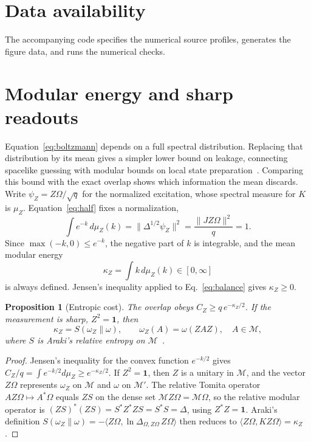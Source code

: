 \documentclass[11pt,a4paper]{article}
\providecommand{\openone}{\mathbf{1}}
\newtheorem{proposition}[theorem]{Proposition}
\newcommand{\M}{\mathcal M}
\newcommand{\id}{\openone}
\begin{document}
\section*{Data availability}
The accompanying code specifies the numerical source profiles, generates the figure data, and runs the numerical checks.

\appendix

\section{Modular energy and sharp readouts}
\label{sec:cost}

Equation~\eqref{eq:boltzmann} depends on a full spectral distribution. Replacing that distribution by its mean gives a simpler lower bound on leakage, connecting spacelike guessing with modular bounds on local state preparation~\cite{blanco2026modular}. Comparing this bound with the exact overlap shows which information the mean discards. Write $\psi_Z=Z\Omega/\sqrt q$ for the normalized excitation, whose spectral measure for $K$ is $\mu_Z$. Equation~\eqref{eq:half} fixes a normalization,
\begin{equation}
 \int e^{-k}\,d\mu_Z(k)=\|\Delta^{1/2}\psi_Z\|^2=\frac{\|JZ\Omega\|^2}{q}=1 .
 \label{eq:balance}
\end{equation}
Since $\max(-k,0)\le e^{-k}$, the negative part of $k$ is integrable, and the mean modular energy
\begin{equation}
 \kappa_Z=\int k\,d\mu_Z(k)\in[0,\infty]
 \label{eq:kappa}
\end{equation}
is always defined. Jensen's inequality applied to Eq.~\eqref{eq:balance} gives $\kappa_Z\ge0$.

\begin{proposition}[Entropic cost]
\label{prop:cost}
The overlap obeys $C_Z\ge q\,e^{-\kappa_Z/2}$. If the measurement is sharp, $Z^2=\id$, then
\begin{equation}
 \kappa_Z=S(\omega_Z\|\omega),\qquad \omega_Z(A)=\omega(ZAZ),\quad A\in\M,
 \label{eq:relent}
\end{equation}
where $S$ is Araki's relative entropy on $\M$~\cite{araki1975relative}.
\end{proposition}

\begin{proof}
Jensen's inequality for the convex function $e^{-k/2}$ gives $C_Z/q=\int e^{-k/2}d\mu_Z\ge e^{-\kappa_Z/2}$. If $Z^2=\id$, then $Z$ is a unitary in $\M$, and the vector $Z\Omega$ represents $\omega_Z$ on $\M$ and $\omega$ on $\M'$. The relative Tomita operator $AZ\Omega\mapsto A^*\Omega$ equals $ZS$ on the dense set $\M Z\Omega=\M\Omega$, so the relative modular operator is $(ZS)^*(ZS)=S^*Z^*ZS=S^*S=\Delta$, using $Z^*Z=\id$. Araki's definition $S(\omega_Z\|\omega)=-\langle Z\Omega,\ln\Delta_{\Omega,Z\Omega}\,Z\Omega\rangle$ then reduces to $\langle Z\Omega,KZ\Omega\rangle=\kappa_Z$.
\end{proof}
\end{document}
